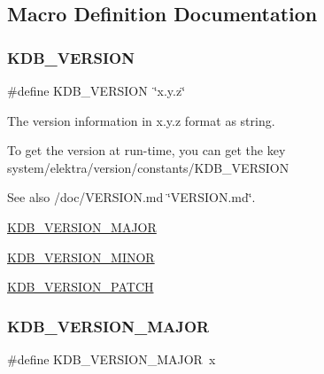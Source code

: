 \subsection{Macro Definition Documentation}
\mbox{\label{group__kdb_ga2f8953fe5f9f28db54b3ef678ebf40d7}} 
\subsubsection{\texorpdfstring{K\+D\+B\+\_\+\+V\+E\+R\+S\+I\+ON}{KDB\_VERSION}}
{\footnotesize\ttfamily \#define K\+D\+B\+\_\+\+V\+E\+R\+S\+I\+ON~\char`\"{}x.\+y.\+z\char`\"{}}



The version information in x.\+y.\+z format as string. 

To get the version at run-\/time, you can get the key system/elektra/version/constants/\+K\+D\+B\+\_\+\+V\+E\+R\+S\+I\+ON

\begin{DoxySeeAlso}{See also}
/doc/\+V\+E\+R\+S\+I\+ON.md \char`\"{}\+V\+E\+R\+S\+I\+O\+N.\+md\char`\"{}. 

\hyperlink{group__kdb_ga57ee4c9e19daac86934e62441f8755fc}{K\+D\+B\+\_\+\+V\+E\+R\+S\+I\+O\+N\+\_\+\+M\+A\+J\+OR} 

\hyperlink{group__kdb_ga3407dacaacc5d83e2046db872b2408a9}{K\+D\+B\+\_\+\+V\+E\+R\+S\+I\+O\+N\+\_\+\+M\+I\+N\+OR} 

\hyperlink{group__kdb_gaa67fb397397981929b24f52ed2a2d92d}{K\+D\+B\+\_\+\+V\+E\+R\+S\+I\+O\+N\+\_\+\+P\+A\+T\+CH} 
\end{DoxySeeAlso}
\mbox{\label{group__kdb_ga57ee4c9e19daac86934e62441f8755fc}} 
\subsubsection{\texorpdfstring{K\+D\+B\+\_\+\+V\+E\+R\+S\+I\+O\+N\+\_\+\+M\+A\+J\+OR}{KDB\_VERSION\_MAJOR}}
{\footnotesize\ttfamily \#define K\+D\+B\+\_\+\+V\+E\+R\+S\+I\+O\+N\+\_\+\+M\+A\+J\+OR~x}



